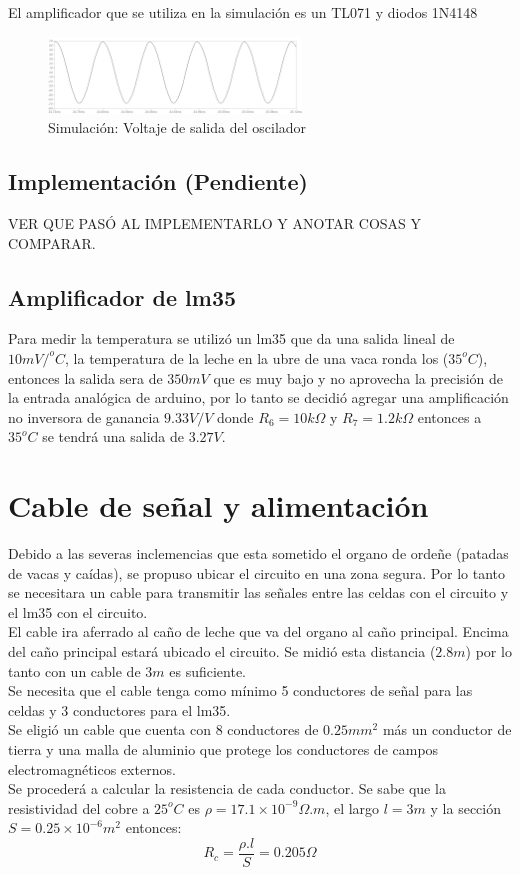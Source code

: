 
El amplificador que se utiliza en la simulación es un TL071 y diodos 1N4148
\begin{figure}[H]
	\centering
	\includegraphics[width=0.6\textwidth]{Oscilador/salida_simulada.png}
	\caption{Simulación: Voltaje de salida del oscilador}
	\label{sim:Vosc}
\end{figure}
\subsection{Implementación (Pendiente)}
VER QUE PASÓ AL IMPLEMENTARLO Y ANOTAR COSAS Y COMPARAR.

\subsection{Amplificador de lm35}
Para medir la temperatura se utilizó un lm35 que da una salida lineal de $10mV/^{o}C$, la temperatura de la leche en la ubre de una vaca ronda los ($35^{o}C$), entonces la salida sera de $350mV$ que es muy bajo y no aprovecha la precisión de la entrada analógica de arduino, por lo tanto se decidió agregar una amplificación no inversora de ganancia $9.33V/V$ donde $R_{6}=10k\Omega$ y $R_{7}=1.2k\Omega$ entonces a $35^{o}C$ se tendrá una salida de $3.27V$.

\section{Cable de señal y alimentación}
Debido a las severas inclemencias que esta sometido el organo de ordeñe (patadas de vacas y caídas), se propuso ubicar el circuito en una zona segura. Por lo tanto se necesitara un cable para transmitir las señales entre las celdas con el circuito y el lm35 con el circuito.\\
El cable ira aferrado al caño de leche que va del organo al caño principal. Encima del caño principal estará ubicado el circuito. Se midió esta distancia ($2.8m$) por lo tanto con un cable de $3m$ es suficiente.\\
Se necesita que el cable tenga como mínimo 5 conductores de señal para las celdas y 3 conductores para el lm35.\\
Se eligió un cable que cuenta con 8 conductores de $0.25mm^{2}$ más un conductor de tierra y una malla de aluminio que protege los conductores de campos electromagnéticos externos.\\
Se procederá a calcular la resistencia de cada conductor. Se sabe que la resistividad del cobre a $25^{o}C$ es $\rho= 17.1\times 10^{-9} \Omega .m$, el largo $l=3m$ y la sección $S=0.25\times 10^{-6}m^{2}$ entonces: \begin{equation}
R_{c}=\dfrac{\rho .l}{S}=0.205 \Omega
\label{eq:RC}
\end{equation}

